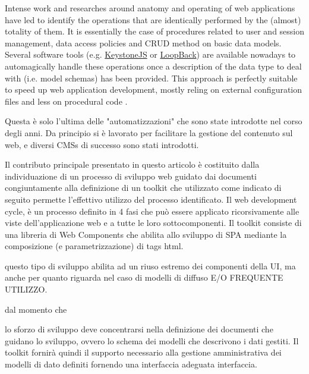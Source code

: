 






Intense work and researches around anatomy and operating of web applications have led to identify the operations that are identically performed by the (almost) totality of them. It is essentially the case of procedures related to user and session management, data access policies and CRUD method on basic data models.
Several software tools (e.g. \href{http://keystonejs.com}{KeystoneJS} or \href{http://loopback.io}{LoopBack}) are available nowadays to automagically handle these operations once a description of the data type to deal with (i.e. model schemas) has been provided. This approach is perfectly suitable to speed up web application development, mostly reling on external configuration files and less on procedural code \cite{6859693}.

Questa è solo l'ultima delle "automatizzazioni" che sono state introdotte nel corso degli anni. Da principio si è lavorato per facilitare la gestione del contenuto sul web, e diversi CMSs di successo sono stati introdotti. 





Il contributo principale presentato in questo articolo è costituito dalla individuazione di un processo di sviluppo web guidato dai documenti congiuntamente alla definizione di un toolkit che utilizzato come indicato di seguito permette l'effettivo utilizzo del processo identificato. Il web development cycle, è un processo definito in 4 fasi che può essere applicato ricorsivamente alle viste dell'applicazione web e a tutte le loro sottocomponenti. Il toolkit consiste di una libreria di Web Components che abilita allo sviluppo di SPA mediante la composizione (e parametrizzazione) di tags html.

questo tipo di sviluppo abilita ad un riuso estremo dei componenti della UI, ma anche per quanto riguarda nel caso di modelli di diffuso E/O FREQUENTE UTILIZZO.


dal momento che 


lo sforzo di sviluppo deve concentrarsi nella definizione dei documenti che guidano lo sviluppo, ovvero lo schema dei modelli che descrivono i dati gestiti. Il toolkit fornirà quindi il supporto necessario alla gestione amministrativa dei modelli di dato definiti fornendo una interfaccia adeguata interfaccia.











